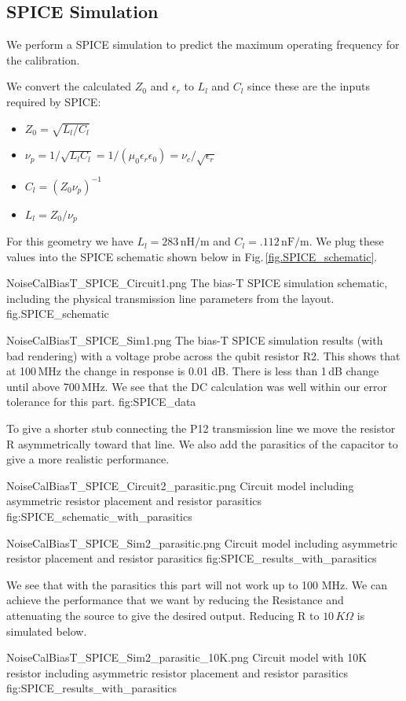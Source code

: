 \subsection{SPICE Simulation}
We perform a SPICE simulation to predict the maximum operating frequency for the calibration.

We convert the calculated $Z_0$ and $\epsilon_r$ to $L_l$ and $C_l$ since these are the inputs required by SPICE:
\begin{itemize}
\item $Z_0 = \sqrt{L_l / C_l}$
\item $\nu_p = 1/\sqrt{L_l C_l} = 1 / (\mu_0 \epsilon_r \epsilon_0) = \nu_c / \sqrt{\epsilon_r}$
\item $C_l = (Z_0 \nu_p)^{-1}$
\item $L_l = Z_0 / \nu_p$
\end{itemize}
For this geometry we have $L_l = 283\,\text{nH/m}$ and $C_l = .112\,\text{nF/m}$.
We plug these values into the SPICE schematic shown below in Fig.\,\ref{fig.SPICE_schematic}.

\quickfig{\columnwidth}
{NoiseCalBiasT_SPICE_Circuit1.png}
{
The bias-T SPICE simulation schematic, including the physical transmission line parameters from the layout.}
{fig.SPICE_schematic}

\quickfig{\columnwidth}
{NoiseCalBiasT_SPICE_Sim1.png}
{
The bias-T SPICE simulation results (with bad rendering) with a voltage probe across the qubit resistor R2.
This shows that at 100\,MHz the change in response is 0.01 dB.
There is less than 1\,dB change until above 700\,MHz.
We see that the DC calculation was well within our error tolerance for this part.}
{fig:SPICE_data}

To give a shorter stub connecting the P12 transmission line we move the resistor R asymmetrically toward that line.  We also add the parasitics of the capacitor to give a more realistic performance.

\quickfig{\columnwidth}
{NoiseCalBiasT_SPICE_Circuit2_parasitic.png}
{
Circuit model including asymmetric resistor placement and resistor parasitics}
{fig:SPICE_schematic_with_parasitics}

\quickfig{\columnwidth}
{NoiseCalBiasT_SPICE_Sim2_parasitic.png}
{
Circuit model including asymmetric resistor placement and resistor parasitics}
{fig:SPICE_results_with_parasitics}

We see that with the parasitics this part will not work up to 100 MHz.  We can achieve the performance that we want by reducing the Resistance and attenuating the source to give the desired output.  Reducing R to $10$\,$K\Omega$ is simulated below.

\quickfig{\columnwidth}
{NoiseCalBiasT_SPICE_Sim2_parasitic_10K.png}
{
Circuit model with 10K resistor including asymmetric resistor placement and resistor parasitics}
{fig:SPICE_results_with_parasitics}


\begin{comment}
To predict the maximum frequency of operation for this bias T were going to do a SPICE simulation of the circuit below where the parasitic capacitance is from a COMSOL simulation.
\end{comment}

% 